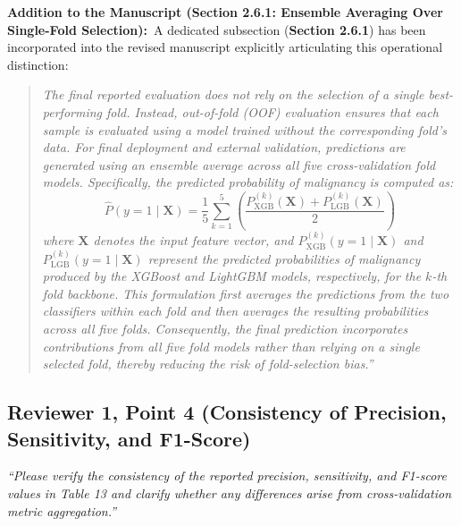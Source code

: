 \documentclass[11pt,a4paper]{article}
\newcommand{\reviewer}[1]{{\color{reviewgray}\textit{#1}}}
\newenvironment{authorresponse}{\par\begingroup\color{authorblue}}{\endgroup\par}
\begin{document}
\begin{authorresponse}
\textbf{Addition to the Manuscript (Section 2.6.1: Ensemble Averaging Over Single-Fold Selection):}\
A dedicated subsection (\textbf{Section 2.6.1}) has been incorporated into the revised manuscript explicitly articulating this operational distinction:\
\begin{quote}\itshape
The final reported evaluation does not rely on the selection of a single best-performing fold. Instead, out-of-fold (OOF) evaluation ensures that each sample is evaluated using a model trained without the corresponding fold’s data. For final deployment and external validation, predictions are generated using an ensemble average across all five cross-validation fold models. Specifically, the predicted probability of malignancy is computed as:
\[
\hat{P}(y = 1 \mid \mathbf{X}) = \frac{1}{5}\sum_{k=1}^{5}\left(\frac{P^{(k)}_{\mathrm{XGB}}(\mathbf{X}) + P^{(k)}_{\mathrm{LGB}}(\mathbf{X})}{2}\right)
\]
where $\mathbf{X}$ denotes the input feature vector, and $P^{(k)}_{\mathrm{XGB}}(y = 1 \mid \mathbf{X})$ and $P^{(k)}_{\mathrm{LGB}}(y = 1 \mid \mathbf{X})$ represent the predicted probabilities of malignancy produced by the XGBoost and LightGBM models, respectively, for the $k$-th fold backbone. This formulation first averages the predictions from the two classifiers within each fold and then averages the resulting probabilities across all five folds. Consequently, the final prediction incorporates contributions from all five fold models rather than relying on a single selected fold, thereby reducing the risk of fold-selection bias.''
\end{quote}
\end{authorresponse}

\vspace{1.5em}

\subsection*{Reviewer 1, Point 4 (Consistency of Precision, Sensitivity, and F1-Score)}

\reviewer{“Please verify the consistency of the reported precision, sensitivity, and F1-score values in Table 13 and clarify whether any differences arise from cross-validation metric aggregation.”}
\end{document}
